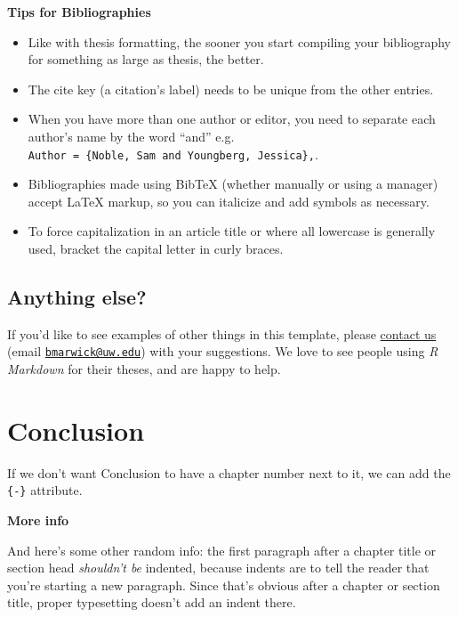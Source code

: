 \documentclass[twoside,12pt,final]{ucthesis-CA2012}
\providecommand{\tightlist}{%
  \setlength{\itemsep}{0pt}\setlength{\parskip}{0pt}}
\begin{document}
\begin{ucmainmatter}
\textbf{Tips for Bibliographies}
\begin{itemize}
\tightlist
\item
  Like with thesis formatting, the sooner you start compiling your
  bibliography for something as large as thesis, the better.
\item
  The cite key (a citation's label) needs to be unique from the other
  entries.
\item
  When you have more than one author or editor, you need to separate
  each author's name by the word ``and'' e.g.
  \texttt{Author\ =\ \{Noble,\ Sam\ and\ Youngberg,\ Jessica\},}.
\item
  Bibliographies made using BibTeX (whether manually or using a manager)
  accept LaTeX markup, so you can italicize and add symbols as
  necessary.
\item
  To force capitalization in an article title or where all lowercase is
  generally used, bracket the capital letter in curly braces.
\end{itemize}
\hypertarget{anything-else}{%
\section{Anything else?}\label{anything-else}}

If you'd like to see examples of other things in this template, please
\href{https://github.com/benmarwick/huskydown/issues/new}{contact us}
(email \href{mailto:bmarwick@uw.edu}{\nolinkurl{bmarwick@uw.edu}}) with
your suggestions. We love to see people using \emph{R Markdown} for
their theses, and are happy to help.

\hypertarget{conclusion}{%
\chapter*{Conclusion}\label{conclusion}}

If we don't want Conclusion to have a chapter number next to it, we can
add the \texttt{\{-\}} attribute.

\textbf{More info}

And here's some other random info: the first paragraph after a chapter
title or section head \emph{shouldn't be} indented, because indents are
to tell the reader that you're starting a new paragraph. Since that's
obvious after a chapter or section title, proper typesetting doesn't add
an indent there.

\appendix


\end{ucmainmatter}
\end{document}
